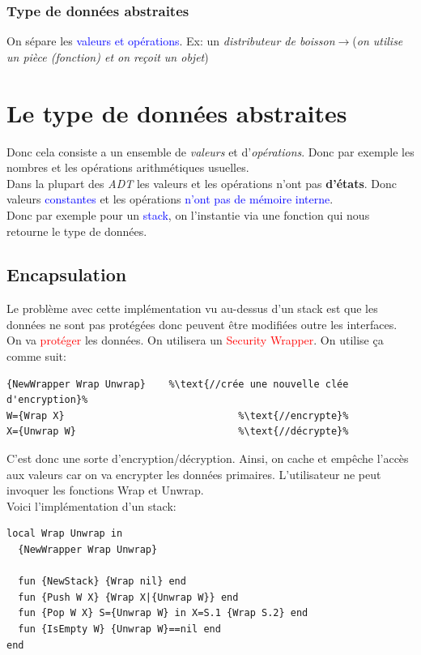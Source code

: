 \documentclass{report}
\begin{document}
\subsubsection{Type de données abstraites}
On sépare les \textcolor{blue}{valeurs et opérations}. Ex: un \textit{distributeur de boisson}$\rightarrow$(\textit{on utilise un pièce (fonction) et on reçoit un objet})

\section{Le type de données abstraites}
Donc cela consiste a un ensemble de \textit{valeurs} et d'\textit{opérations}. Donc par exemple les nombres et les opérations arithmétiques usuelles.\\
Dans la plupart des \textit{ADT} les valeurs et les opérations n'ont pas \textbf{d'états}. Donc valeurs \textcolor{blue}{constantes} et les opérations \textcolor{blue}{n'ont pas de mémoire interne}.\\
Donc par exemple pour un \textcolor{blue}{stack}, on l'instantie via une fonction qui nous retourne le type de données.\\

\subsection{Encapsulation}
Le problème avec cette implémentation vu au-dessus d'un stack est que les données ne sont pas protégées donc peuvent être modifiées outre les interfaces.\\

On va \textcolor{red}{protéger} les données. On utilisera un \textcolor{red}{Security Wrapper}. On utilise ça comme suit:
\begin{lstlisting}[escapechar=\%]
{NewWrapper Wrap Unwrap}	%\text{//crée une nouvelle clée d'encryption}%
W={Wrap X} 								%\text{//encrypte}%
X={Unwrap W} 							%\text{//décrypte}%
\end{lstlisting}
C'est donc une sorte d'encryption/décryption. Ainsi, on cache et empêche l'accès aux valeurs car on va encrypter les données primaires. L'utilisateur ne peut invoquer les fonctions Wrap et Unwrap.\\
Voici l'implémentation d'un stack:
\begin{lstlisting}[escapechar=\%]
local Wrap Unwrap in
  {NewWrapper Wrap Unwrap}

  fun {NewStack} {Wrap nil} end 
  fun {Push W X} {Wrap X|{Unwrap W}} end 
  fun {Pop W X} S={Unwrap W} in X=S.1 {Wrap S.2} end
  fun {IsEmpty W} {Unwrap W}==nil end
end
\end{lstlisting}
\end{document}
